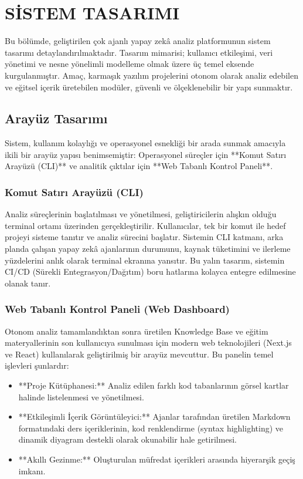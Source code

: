 
\chapter{SİSTEM TASARIMI}
\label{ch:sistem-tasarimi}

Bu bölümde, geliştirilen çok ajanlı yapay zekâ analiz platformunun sistem tasarımı detaylandırılmaktadır. Tasarım mimarisi; kullanıcı etkileşimi, veri yönetimi ve nesne yönelimli modelleme olmak üzere üç temel eksende kurgulanmıştır. Amaç, karmaşık yazılım projelerini otonom olarak analiz edebilen ve eğitsel içerik üretebilen modüler, güvenli ve ölçeklenebilir bir yapı sunmaktır.

\section{Arayüz Tasarımı}
\label{sec:arayuz-tasarimi}

Sistem, kullanım kolaylığı ve operasyonel esnekliği bir arada sunmak amacıyla ikili bir arayüz yapısı benimsemiştir: Operasyonel süreçler için **Komut Satırı Arayüzü (CLI)** ve analitik çıktılar için **Web Tabanlı Kontrol Paneli**.

\subsection{Komut Satırı Arayüzü (CLI)}
Analiz süreçlerinin başlatılması ve yönetilmesi, geliştiricilerin alışkın olduğu terminal ortamı üzerinden gerçekleştirilir. Kullanıcılar, tek bir komut ile hedef projeyi sisteme tanıtır ve analiz sürecini başlatır. Sistemin CLI katmanı, arka planda çalışan yapay zekâ ajanlarının durumunu, kaynak tüketimini ve ilerleme yüzdelerini anlık olarak terminal ekranına yansıtır. Bu yalın tasarım, sistemin CI/CD (Sürekli Entegrasyon/Dağıtım) boru hatlarına kolayca entegre edilmesine olanak tanır.

\subsection{Web Tabanlı Kontrol Paneli (Web Dashboard)}
Otonom analiz tamamlandıktan sonra üretilen Knowledge Base ve eğitim materyallerinin son kullanıcıya sunulması için modern web teknolojileri (Next.js ve React) kullanılarak geliştirilmiş bir arayüz mevcuttur. Bu panelin temel işlevleri şunlardır:

\begin{itemize}
    \item **Proje Kütüphanesi:** Analiz edilen farklı kod tabanlarının görsel kartlar halinde listelenmesi ve yönetilmesi.
    \item **Etkileşimli İçerik Görüntüleyici:** Ajanlar tarafından üretilen Markdown formatındaki ders içeriklerinin, kod renklendirme (syntax highlighting) ve dinamik diyagram destekli olarak okunabilir hale getirilmesi.
    \item **Akıllı Gezinme:** Oluşturulan müfredat içerikleri arasında hiyerarşik geçiş imkanı.
\end{itemize}

